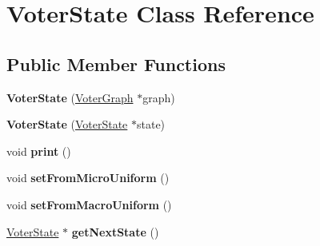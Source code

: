 \hypertarget{class_voter_state}{\section{Voter\-State Class Reference}
\label{class_voter_state}
}
\subsection*{Public Member Functions}
\begin{DoxyCompactItemize}
\item 
\hypertarget{class_voter_state_a0c3a8bff59a2bafc229a3db931ca187c}{{\bfseries Voter\-State} (\hyperlink{class_voter_graph}{Voter\-Graph} $\ast$graph)}\label{class_voter_state_a0c3a8bff59a2bafc229a3db931ca187c}

\item 
\hypertarget{class_voter_state_ab0d594ad34986c52cdd05aa83e8237d8}{{\bfseries Voter\-State} (\hyperlink{class_voter_state}{Voter\-State} $\ast$state)}\label{class_voter_state_ab0d594ad34986c52cdd05aa83e8237d8}

\item 
\hypertarget{class_voter_state_aa2f895e33bc38461b80d175b174f440d}{void {\bfseries print} ()}\label{class_voter_state_aa2f895e33bc38461b80d175b174f440d}

\item 
\hypertarget{class_voter_state_a061807952a7a83b53067ad3da4928f1e}{void {\bfseries set\-From\-Micro\-Uniform} ()}\label{class_voter_state_a061807952a7a83b53067ad3da4928f1e}

\item 
\hypertarget{class_voter_state_a8e7e962feebe6dc2f5cb7248207486da}{void {\bfseries set\-From\-Macro\-Uniform} ()}\label{class_voter_state_a8e7e962feebe6dc2f5cb7248207486da}

\item 
\hypertarget{class_voter_state_a075f01f6b7e5ae1cdcfae96727817612}{\hyperlink{class_voter_state}{Voter\-State} $\ast$ {\bfseries get\-Next\-State} ()}\label{class_voter_state_a075f01f6b7e5ae1cdcfae96727817612}

\end{DoxyCompactItemize}
